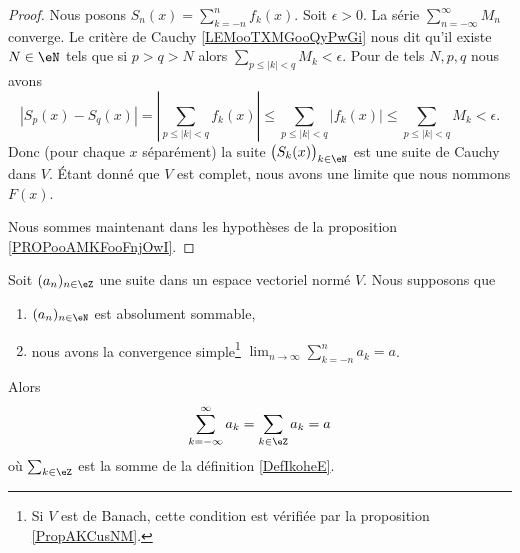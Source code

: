 \begin{proof}
	Nous posons \( S_n(x)=\sum_{k=-n}^nf_k(x)\). Soit \( \epsilon>0\). La série \( \sum_{n=-\infty}^{\infty}M_n\) converge. Le critère de Cauchy \ref{LEMooTXMGooQyPwGi} nous dit qu'il existe \( N\in \eN\) tels que si \( p>q>N\) alors \( \sum_{p\leq | k |<q}M_k<\epsilon\). Pour de tels \( N,p,q\) nous avons
	\begin{equation}
		| S_p(x)-S_q(x) |=| \sum_{p\leq| k |<q}f_k(x) |\leq \sum_{p\leq | k |<q}| f_k(x) |\leq \sum_{p\leq | k |<q}M_k<\epsilon.
	\end{equation}
	Donc (pour chaque \( x\) séparément) la suite \( \big( S_k(x) \big)_{k\in \eN}\) est une suite de Cauchy dans \( V\). Étant donné que \( V\) est complet, nous avons une limite que nous nommons \( F(x)\).

	Nous sommes maintenant dans les hypothèses de la proposition \ref{PROPooAMKFooFnjOwI}.
\end{proof}


\begin{proposition}	\label{PROPooZMLAooCUEqQK}
	Soit \( (a_n)_{n\in \eZ}\) une suite dans un espace vectoriel normé \( V\). Nous supposons que
	\begin{enumerate}
		\item
		      \( (a_n)_{n\in \eN}\) est absolument sommable,
		\item
		      nous avons la convergence simple\footnote{Si \( V\) est de Banach, cette condition est vérifiée par la proposition \ref{PropAKCusNM}.} \( \lim_{n\to\infty}\sum_{k=-n}^na_k=a\).
	\end{enumerate}
	Alors
	\begin{equation}
		\sum_{k=-\infty}^{\infty}a_k=\sum_{k\in \eZ}a_k=a
	\end{equation}
	où \( \sum_{k\in \eZ}\) est la somme de la définition \ref{DefIkoheE}.
\end{proposition}

